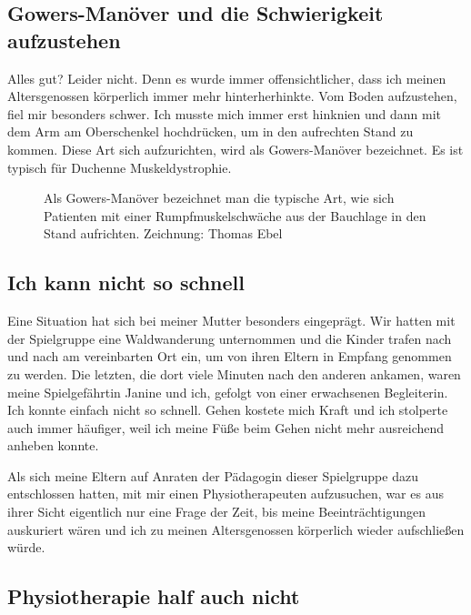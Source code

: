 \documentclass[fontsize=14pt,a4paper,headinclude,DIV=calc,automark]{scrbook}
\begin{document}
\subsection{Gowers-Manöver und die Schwierigkeit aufzustehen}

Alles gut? Leider nicht. Denn es wurde immer offensichtlicher, dass ich meinen Altersgenossen körperlich immer mehr hinterherhinkte. Vom Boden aufzustehen, fiel mir besonders schwer. Ich musste mich immer erst hinknien und dann mit dem Arm am Oberschenkel hochdrücken, um in den aufrechten Stand zu kommen. Diese Art sich aufzurichten, wird als Gowers-Manöver bezeichnet. Es ist typisch für Duchenne Muskeldystrophie.

\setlength{\fboxsep}{0pt}    %
\setlength{\fboxrule}{0.2pt} %
\begin{figure}[ht]
    \centering
    \caption{Als Gowers-Manöver bezeichnet man die typische Art, wie sich Patienten mit einer Rumpfmuskelschwäche aus der Bauchlage in den Stand aufrichten. Zeichnung: Thomas Ebel}
    \label{fig:gowers-manöver}
\end{figure}

\subsection{Ich kann nicht so schnell}

Eine Situation hat sich bei meiner Mutter besonders eingeprägt. Wir hatten mit der Spielgruppe eine Waldwanderung unternommen und die Kinder trafen nach und nach am vereinbarten Ort ein, um von ihren Eltern in Empfang genommen zu werden. Die letzten, die dort viele Minuten nach den anderen ankamen, waren meine Spielgefährtin Janine und ich, gefolgt von einer erwachsenen Begleiterin. Ich konnte einfach nicht so schnell. Gehen kostete mich Kraft und ich stolperte auch immer häufiger, weil ich meine Füße beim Gehen nicht mehr ausreichend anheben konnte.

Als sich meine Eltern auf Anraten der Pädagogin dieser Spielgruppe dazu entschlossen hatten, mit mir einen Physiotherapeuten aufzusuchen, war es aus ihrer Sicht eigentlich nur eine Frage der Zeit, bis meine Beeinträchtigungen auskuriert wären und ich zu meinen Altersgenossen körperlich wieder aufschließen würde.

\subsection{Physiotherapie half auch nicht}
\end{document}
